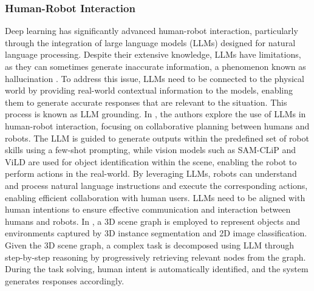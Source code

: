 \documentclass[preprint,12pt]{elsarticle}
\begin{document}
\subsubsection{Human-Robot Interaction}
Deep learning has significantly advanced human-robot interaction, particularly through the integration of large language models (LLMs) designed for natural language processing. Despite their extensive knowledge, LLMs have limitations, as they can sometimes generate inaccurate information, a phenomenon known as hallucination \citep{huang_survey_2025}. To address this issue, LLMs need to be connected to the physical world by providing real-world contextual information to the models, enabling them to generate accurate responses that are relevant to the situation. This process is known as LLM grounding. In \citep{asuzu_humanrobot_2025}, the authors explore the use of LLMs in human-robot interaction, focusing on collaborative planning between humans and robots. The LLM is guided to generate outputs within the predefined set of robot skills using a few-shot prompting, while vision models such as SAM-CLiP and ViLD are used for object identification within the scene, enabling the robot to perform actions in the real-world. By leveraging LLMs, robots can understand and process natural language instructions and execute the corresponding actions, enabling efficient collaboration with human users. LLMs need to be aligned with human intentions to ensure effective communication and interaction between humans and robots. In \citep{chen_synergai_2024}, a 3D scene graph is employed to represent objects and environments captured by 3D instance segmentation and 2D image classification. Given the 3D scene graph, a complex task is decomposed using LLM through step-by-step reasoning by progressively retrieving relevant nodes from the graph. During the task solving, human intent is automatically identified, and the system generates responses accordingly.
\end{document}

